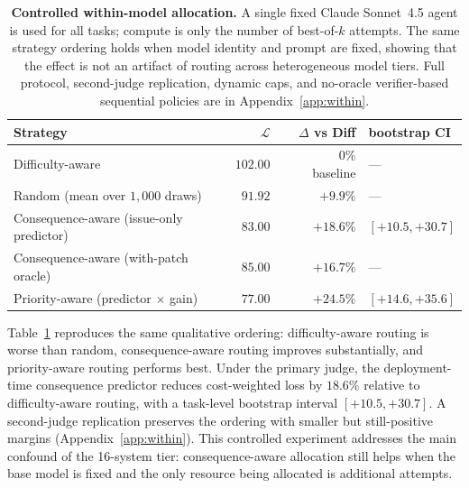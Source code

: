 \documentclass{article}
\begin{document}
\begin{table}[t]
\centering
\caption{\textbf{Controlled within-model allocation.} A single fixed
Claude Sonnet~4.5 agent is used for all tasks; compute is only the
number of best-of-$k$ attempts. The same strategy ordering holds when
model identity and prompt are fixed, showing that the effect is not an
artifact of routing across heterogeneous model tiers. Full protocol,
second-judge replication, dynamic caps, and no-oracle verifier-based
sequential policies are in Appendix~\ref{app:within}.}
\label{tab:withinmain}
\small
\begin{tabular}{lrrl}
\toprule
Strategy & $\mathcal{L}$ & $\Delta$ vs Diff & bootstrap CI \\
\midrule
Difficulty-aware                         & $102.00$ & ~~$0\%$ baseline & --- \\
Random (mean over $1{,}000$ draws)        & $91.92$  & $+9.9\%$ & --- \\
Consequence-aware (issue-only predictor)  & $83.00$  & $+18.6\%$ & $[+10.5, +30.7]$ \\
Consequence-aware (with-patch oracle)     & $85.00$  & $+16.7\%$ & --- \\
Priority-aware (predictor $\times$ gain)  & $\mathbf{77.00}$ & $\mathbf{+24.5\%}$ & $[+14.6, +35.6]$ \\
\bottomrule
\end{tabular}
\end{table}

Table~\ref{tab:withinmain} reproduces the same qualitative ordering:
difficulty-aware routing is worse than random, consequence-aware
routing improves substantially, and priority-aware routing performs
best. Under the primary judge, the deployment-time consequence
predictor reduces cost-weighted loss by $18.6\%$ relative to
difficulty-aware routing, with a task-level bootstrap interval
$[+10.5,+30.7]$. A second-judge replication preserves the ordering with
smaller but still-positive margins (Appendix~\ref{app:within}). This
controlled experiment addresses the main confound of the 16-system
tier: consequence-aware allocation still helps when the base model is
fixed and the only resource being allocated is additional attempts.
\end{document}

